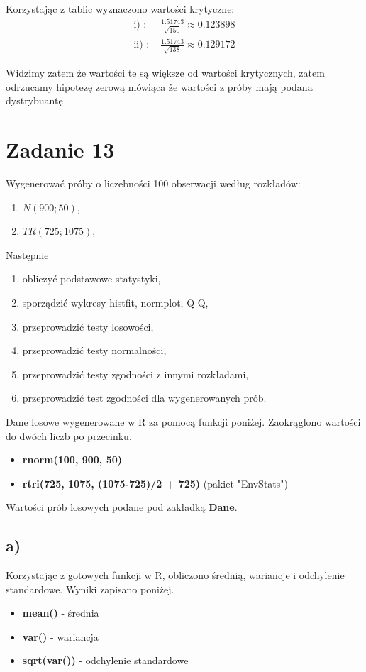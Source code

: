 \documentclass{article}
\begin{document}
Korzystając z tablic wyznaczono wartości krytyczne:
\begin{align*}
\text{i) : } & \frac{1.51743}{\sqrt{150}} \approx 0.123898 \\
\text{ii) : } & \frac{1.51743}{\sqrt{138}} \approx 0.129172
\end{align*}

Widzimy zatem że wartości te są większe od wartości krytycznych, zatem odrzucamy hipotezę zerową mówiąca że wartości z próby mają podana dystrybuantę

\newpage
\section{Zadanie 13}
Wygenerować próby o liczebności 100 obserwacji według rozkładów:
\begin{enumerate}[label = \roman*)]
\item $N(900;50)$,
\item $TR(725;1075)$,
\end{enumerate}
Następnie
\begin{enumerate}[label = \alph*)]
\item obliczyć podstawowe statystyki,
\item sporządzić wykresy histfit, normplot, Q-Q,
\item przeprowadzić testy losowości,
\item przeprowadzić testy normalności,
\item przeprowadzić testy zgodności z innymi rozkładami,
\item przeprowadzić test zgodności dla wygenerowanych prób.
\end{enumerate}

Dane losowe wygenerowane w R za pomocą funkcji poniżej. Zaokrąglono wartości do dwóch liczb po przecinku.
\begin{itemize}
\item \textbf{rnorm(100, 900, 50)}
\item \textbf{rtri(725, 1075, (1075-725)/2 + 725)} (pakiet "EnvStats")
\end{itemize}
Wartości prób losowych podane pod zakładką \textbf{Dane}.

\subsection{a)}
Korzystając z gotowych funkcji w R, obliczono średnią, wariancje i odchylenie standardowe. Wyniki zapisano poniżej.
\begin{itemize}
\item \textbf{mean()} - średnia
\item \textbf{var()} - wariancja
\item \textbf{sqrt(var())} - odchylenie standardowe
\end{itemize}
\end{document}
